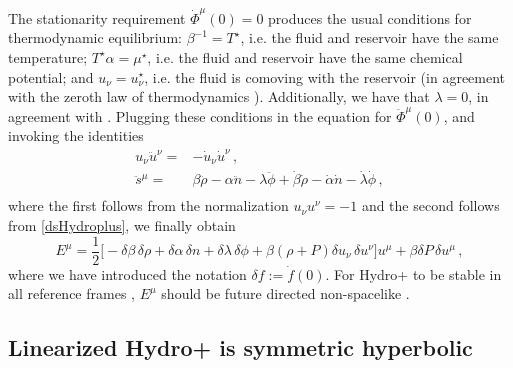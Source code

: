 \documentclass[a4paper, amsfonts, amssymb, amsmath, reprint, showkeys, nofootinbib, twoside, onecolumn,notitlepage]{revtex4-1}
\begin{document}
The stationarity requirement $\dot{\Phi}^\mu(0)=0$ produces the usual conditions for thermodynamic equilibrium: $\beta^{-1}=T^\star$, i.e. the fluid and reservoir have the same temperature; $T^\star\alpha=\mu^\star$, i.e. the fluid and reservoir have the same chemical potential; and $u_\nu = u^\star_\nu$, i.e. the fluid is comoving with the reservoir (in agreement with the zeroth law of thermodynamics \cite{GavassinoTermometri}). Additionally, we have that $\lambda=0$, in agreement with \cite{Hydro+2018}. Plugging these conditions in the equation for $\ddot{\Phi}^\mu(0)$, and invoking the identities
\begin{equation}
\begin{split}
u_\nu \ddot{u}^\nu={}& -\dot{u}_\nu \dot{u}^\nu \, , \\
\ddot{s}^\mu ={}& \beta \ddot{\rho}-\alpha \ddot{n}-\lambda \ddot{\phi}+\dot{\beta}\dot{\rho}-\dot{\alpha}\dot{n}-\dot{\lambda}\dot{\phi} \, ,\\
\end{split}
\end{equation} 
where the first follows from the normalization $u_\nu u^\nu=-1$ and the second follows from \eqref{dsHydroplus}, we finally obtain
\begin{equation}
E^\mu = \dfrac{1}{2} \big[ -\delta \beta \,\delta \rho+\delta \alpha \, \delta n+\delta \lambda \,\delta \phi +\beta(\rho+P) \delta u_\nu \, \delta u^\nu \big]u^\mu+ \beta \delta P \,\delta u^\mu \, ,
\end{equation}
where we have introduced the notation $\delta f := \dot{f}(0)$. For Hydro+ to be stable  
in all reference frames \cite{Hiscock_Insatibility_first_order,
GavassinoFronntiers2021,
GavassinoSuperluminal2021,GavassinoBounds2023}, $E^\mu$ should be future directed non-spacelike \cite{GavassinoCausality2021}.

\subsection{Linearized Hydro+ is symmetric hyperbolic}
\end{document}
